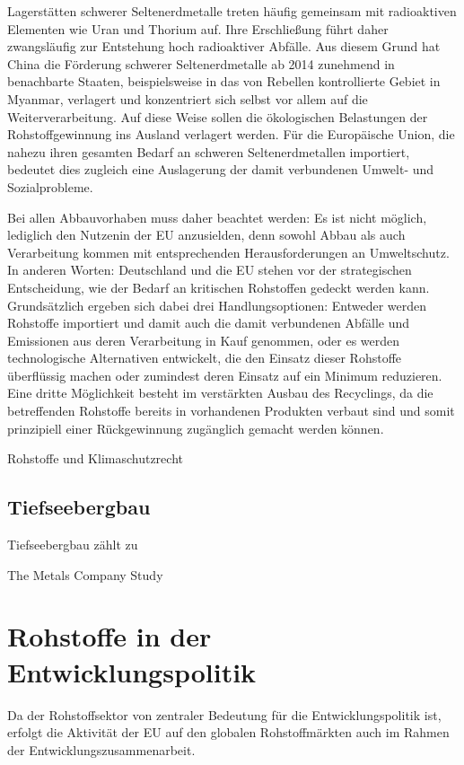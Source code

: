 \documentclass[12pt,a4paper,oneside]{book} %
\begin{document}
Lagerstätten schwerer Seltenerdmetalle treten häufig gemeinsam mit radioaktiven Elementen wie Uran und Thorium auf. Ihre Erschließung führt daher zwangsläufig zur Entstehung hoch radioaktiver Abfälle. Aus diesem Grund hat China die Förderung schwerer Seltenerdmetalle ab 2014 zunehmend in benachbarte Staaten, beispielsweise in das von Rebellen kontrollierte Gebiet in Myanmar, verlagert und konzentriert sich selbst vor allem auf die Weiterverarbeitung. Auf diese Weise sollen die ökologischen Belastungen der Rohstoffgewinnung ins Ausland verlagert werden. Für die Europäische Union, die nahezu ihren gesamten Bedarf an schweren Seltenerdmetallen importiert, bedeutet dies zugleich eine Auslagerung der damit verbundenen Umwelt- und Sozialprobleme.

Bei allen Abbauvorhaben muss daher beachtet werden: Es ist nicht möglich, lediglich den \glqq Nutzen\grqq in der EU anzusielden, denn sowohl Abbau als auch Verarbeitung kommen mit entsprechenden Herausforderungen an Umweltschutz. In anderen Worten: Deutschland und die EU stehen vor der strategischen Entscheidung, wie der Bedarf an kritischen Rohstoffen gedeckt werden kann. Grundsätzlich ergeben sich dabei drei Handlungsoptionen: Entweder werden Rohstoffe importiert und damit auch die damit verbundenen Abfälle und Emissionen aus deren Verarbeitung in Kauf genommen, oder es werden technologische Alternativen entwickelt, die den Einsatz dieser Rohstoffe überflüssig machen oder zumindest deren Einsatz auf ein Minimum reduzieren. Eine dritte Möglichkeit besteht im verstärkten Ausbau des Recyclings, da die betreffenden Rohstoffe bereits in vorhandenen Produkten verbaut sind und somit prinzipiell einer Rückgewinnung zugänglich gemacht werden können.

Rohstoffe und Klimaschutzrecht

\subsection{Tiefseebergbau}

Tiefseebergbau zählt zu 

The Metals Company Study


\section{Rohstoffe in der Entwicklungspolitik}

Da der Rohstoffsektor von zentraler Bedeutung für die Entwicklungspolitik ist, erfolgt die Aktivität der EU auf den globalen Rohstoffmärkten auch im Rahmen der Entwicklungszusammenarbeit.\autocite{Schorkopf, Rn. 53}
\end{document}

